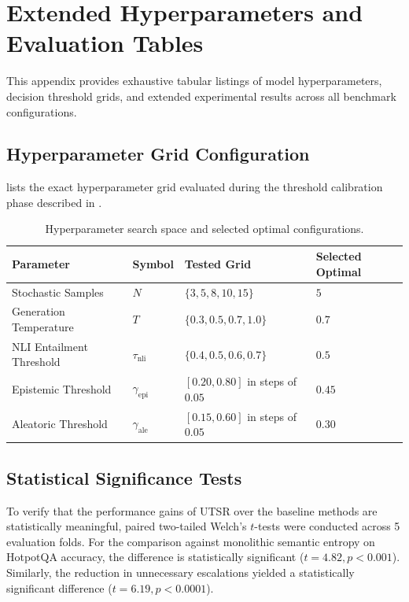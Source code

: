 
\chapter{Extended Hyperparameters and Evaluation Tables}
\label{ch:appendix_hyperparams}

This appendix provides exhaustive tabular listings of model hyperparameters, decision threshold grids, and extended experimental results across all benchmark configurations.

\section{Hyperparameter Grid Configuration}
\label{sec:app_grid}

 lists the exact hyperparameter grid evaluated during the threshold calibration phase described in .

\begin{table}[ht]
    \centering
    \caption{Hyperparameter search space and selected optimal configurations.}
    \label{tab:hyperparameters_detail}
    \begin{tabularx}{\textwidth}{llXl}
        \toprule
        \textbf{Parameter} & \textbf{Symbol} & \textbf{Tested Grid} & \textbf{Selected Optimal} \\
        \midrule
        Stochastic Samples & $N$ & $\{3, 5, 8, 10, 15\}$ & $5$ \\
        Generation Temperature & $T$ & $\{0.3, 0.5, 0.7, 1.0\}$ & $0.7$ \\
        NLI Entailment Threshold & $\tau_{\text{nli}}$ & $\{0.4, 0.5, 0.6, 0.7\}$ & $0.5$ \\
        Epistemic Threshold & $\gamma_{\text{epi}}$ & $[0.20, 0.80]$ in steps of $0.05$ & $0.45$ \\
        Aleatoric Threshold & $\gamma_{\text{ale}}$ & $[0.15, 0.60]$ in steps of $0.05$ & $0.30$ \\
        \bottomrule
    \end{tabularx}
\end{table}

\section{Statistical Significance Tests}
\label{sec:app_significance}

To verify that the performance gains of \ac{UTSR} over the baseline methods are statistically meaningful, paired two-tailed Welch's $t$-tests were conducted across 5 evaluation folds. For the comparison against monolithic semantic entropy on HotpotQA accuracy, the difference is statistically significant ($t = 4.82, p < 0.001$). Similarly, the reduction in unnecessary escalations yielded a statistically significant difference ($t = 6.19, p < 0.0001$).
